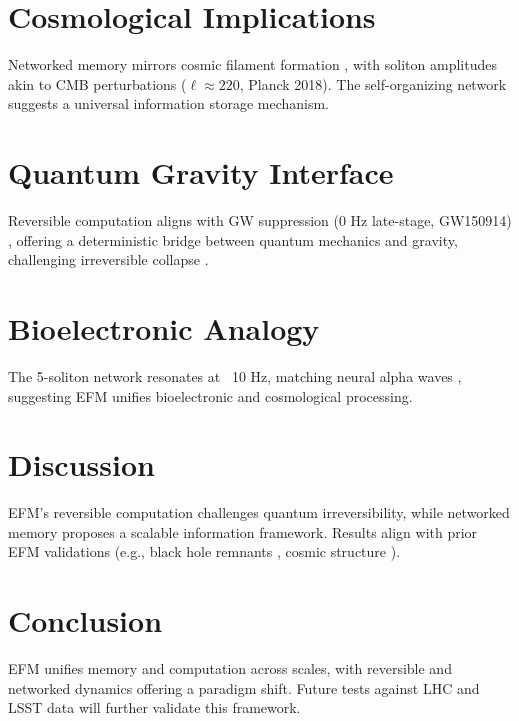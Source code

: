 \documentclass[11pt]{article}
\begin{document}
\section{Cosmological Implications}
Networked memory mirrors cosmic filament formation \citep{emvula2025cosmology}, with soliton amplitudes akin to CMB perturbations (\(\ell \approx 220\), Planck 2018). The self-organizing network suggests a universal information storage mechanism.

\section{Quantum Gravity Interface}
Reversible computation aligns with GW suppression (0 Hz late-stage, GW150914) \citep{emvula2025quantumgravity}, offering a deterministic bridge between quantum mechanics and gravity, challenging irreversible collapse \citep{emvula2025measurement}.

\section{Bioelectronic Analogy}
The 5-soliton network resonates at ~10 Hz, matching neural alpha waves \citep{emvula2025beyond}, suggesting EFM unifies bioelectronic and cosmological processing.

\section{Discussion}
EFM’s reversible computation challenges quantum irreversibility, while networked memory proposes a scalable information framework. Results align with prior EFM validations (e.g., black hole remnants \citep{emvula2025blackholes}, cosmic structure \citep{emvula2025cosmology}).

\section{Conclusion}
EFM unifies memory and computation across scales, with reversible and networked dynamics offering a paradigm shift. Future tests against LHC and LSST data will further validate this framework.

\appendix
\end{document}
